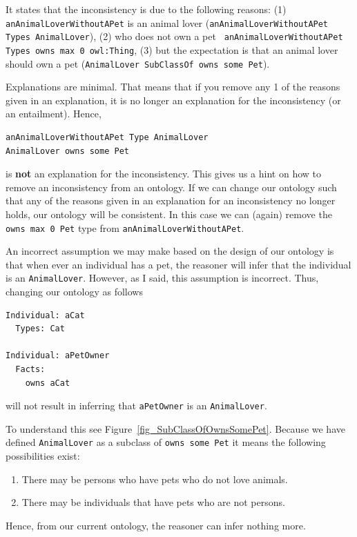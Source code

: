 \documentclass{amsart}
\begin{document}
It states that the inconsistency is due to the following reasons: (1) \texttt{anAnimalLoverWithoutAPet} is an animal lover (\texttt{anAnimalLoverWithoutAPet Types AnimalLover}), (2) who does not own a pet \texttt{ anAnimalLoverWithoutAPet Types owns max 0 owl:Thing}, (3) but the expectation is that an animal lover should own a pet (\texttt{AnimalLover SubClassOf owns some Pet}).

Explanations are minimal. That means that if you remove any 1 of the reasons given in an explanation, it is no longer an explanation for the inconsistency (or an entailment). Hence, 
\begin{small}
\begin{verbatim} 
anAnimalLoverWithoutAPet Type AnimalLover
AnimalLover owns some Pet
\end{verbatim}
\end{small} 
is \textbf{not} an explanation for the inconsistency. This gives us a hint on how to remove an inconsistency from an ontology. If we can change our ontology such that any of the reasons given in an explanation for an inconsistency no longer holds, our ontology will be consistent. In this case we can (again) remove the \texttt{owns max 0 Pet} type from \texttt{anAnimalLoverWithoutAPet}.



An incorrect assumption we may make based on the design of our ontology is that when ever an individual has a pet, the reasoner will infer that the individual is an \texttt{AnimalLover}. However, as I said, this assumption is incorrect. Thus, changing our ontology as follows

\begin{small}
\begin{verbatim} 
Individual: aCat
  Types: Cat

Individual: aPetOwner
  Facts: 
    owns aCat
\end{verbatim}
\end{small} 
will not result in inferring that \texttt{aPetOwner} is an \texttt{AnimalLover}.

To understand this see Figure~\ref{fig_SubClassOfOwnsSomePet}. Because we have defined \texttt{AnimalLover} as a subclass of \texttt{owns some Pet} it means the following possibilities exist:
\begin{enumerate}
 \item There may be persons who have pets who do not love animals.
 \item There may be individuals that have pets who are not persons.
\end{enumerate}
Hence, from our current ontology, the reasoner can infer nothing more.
\end{document}
